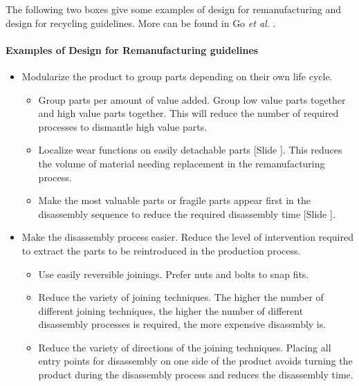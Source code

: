 \documentclass{article}
\newcounter{slide}
\begin{document}
The following two boxes give some examples of design for remanufacturing and design for recycling guidelines. More can be found in Go \emph{et al.} \cite{goMultipleGenerationLifecycles2015a}.

\begin{framed}
\footnotesize
\paragraph{Examples of Design for Remanufacturing guidelines}
\begin{itemize}
	\item Modularize the product to group parts depending on their own life cycle. 
	\begin{itemize}
		\item Group parts per amount of value added. Group low value parts together and high value parts together. This will reduce the number of required processes to dismantle high value parts. 
		\item Localize wear functions on easily detachable parts {\color{blue}[Slide ]}. This reduces the volume of material needing replacement in the remanufacturing process.
		\item Make the most valuable parts or fragile parts appear first in the disassembly sequence to reduce the required disassembly time {\color{blue}[Slide ]}.
	\end{itemize}
	\item Make the disassembly process easier. Reduce the level of intervention required to extract the parts to be reintroduced in the production process.
	\begin{itemize}
    \item Use easily reversible joinings. Prefer nuts and bolts to snap fits.
		\item Reduce the variety of joining techniques. The higher the number of different joining techniques, the higher the number of different disassembly processes is required, the more expensive disassmbly is. 
		\item Reduce the variety of directions of the joining techniques. Placing all entry points for disassembly on one side of the product avoids turning the product during the disassembly process and reduces the disassembly time.
	\end{itemize}
\end{itemize}
\end{framed}
\end{document}
